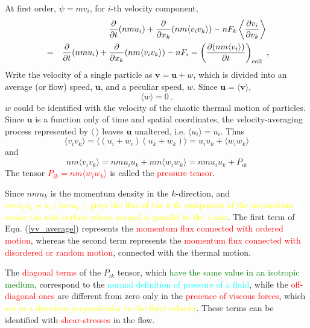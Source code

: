 \documentclass[12pt,a4paper]{article}
\renewcommand{\vec}[1]{\boldsymbol{#1}}
\begin{document}
At first order, $\psi = mv_i$, for $i$-th velocity component,
\begin{eqnarray*}
&&\frac{\partial}{\partial t} (nmu_i) +\frac{\partial}{\partial x_k} (nm\langle v_i v_k\rangle) -nF_k \left\langle \frac{\partial v_i}{\partial v_k} \right\rangle ~\\ 
&=& \frac{\partial}{\partial t} (nmu_i) +\frac{\partial}{\partial x_k} (nm\langle v_i v_k\rangle) -nF_i = \left(\frac{\partial (nm \langle v_i\rangle)}{\partial t} \right)_{\rm coll} ~, 
\end{eqnarray*}
Write the velocity of a single particle as $\vec{v} = \vec{u} +\vec{\mathit{w}}$, which is divided into an average (or flow) speed, $\vec{u}$, and a peculiar speed, $\vec{\mathit{w}}$. Since $\vec{u} = \langle \vec{v} \rangle$, 
\begin{equation}
\langle \vec{\mathit{w}} \rangle = 0 ~.
\end{equation}
$\vec{\mathit{w}}$ could be identified with the velocity of the chaotic thermal motion of particles. Since $\vec{u}$ is a function only of time and spatial coordinates, the velocity-averaging process represented by $\langle ~\rangle$ leaves $\vec{u}$ unaltered, i.e. $\langle u_i \rangle = u_i$. Thus 
\begin{equation}
\langle v_i v_k\rangle = \langle (u_i +\mathit{w}_i)(u_k+\mathit{w}_k)\rangle = u_i u_k + \langle \mathit{w}_i \mathit{w}_k\rangle
\label{vv_average}
\end{equation}
and
\begin{equation*}
nm\langle v_i v_k\rangle = nm u_i u_k + nm \langle \mathit{w}_i \mathit{w}_k\rangle = nm u_i u_k + P_{ik}
\end{equation*}
The tensor \textcolor{red}{$P_{ik} = nm \langle \mathit{w}_i \mathit{w}_k\rangle$} is called the \textcolor{red}{pressure tensor}.

Since $nmu_k$ is the momentum density in the $k$-direction, and \textcolor{yellow}{$nmu_iu_k = u_i(nmu_k)$ gives the flux of the $k$-th component of the momentum across the unit surface whose normal is parallel to the $i$-axis}. The first term of Equ. (\ref{vv_average}) represents the \textcolor{red}{momentum flux connected with ordered motion}, whereas the second term represents the \textcolor{red}{momentum flux connected with disordered or random motion}, connected with the thermal motion. 

The \textcolor{red}{diagonal terms} of the $P_{ik}$ tensor, which \textcolor{green}{have the same value in an isotropic medium}, correspond to the \textcolor{cyan}{normal definition of pressure of a fluid}, while the \textcolor{red}{off-diagonal ones} are different from zero only in the \textcolor{red}{presence of viscous forces}, which \textcolor{yellow}{act in a direction perpendicular to the fluid velocity}. These terms can be identified with \textcolor{red}{shear-stresses} in the flow. 
\end{document}

